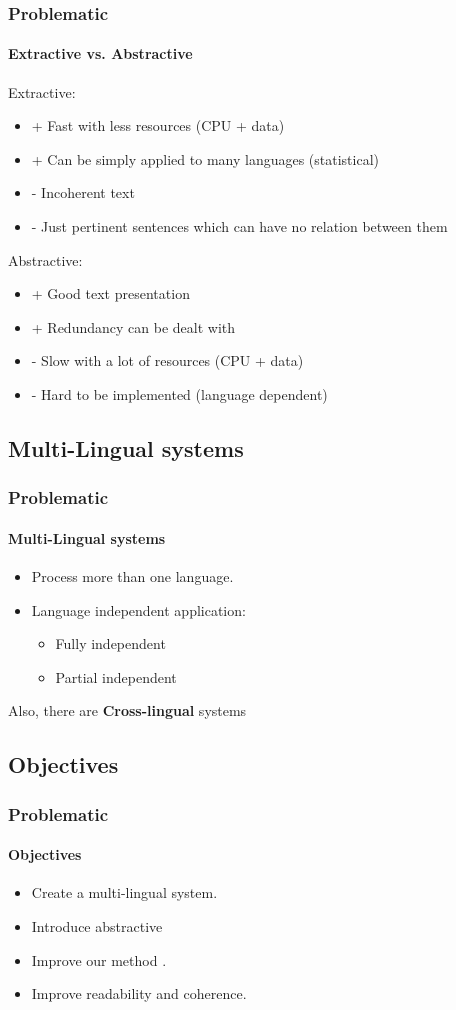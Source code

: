 \documentclass{beamer}
\begin{document}
\begin{frame}
\frametitle{Problematic}
\framesubtitle{Extractive vs. Abstractive}

Extractive:\\
\begin{itemize}
\item + Fast with less resources (CPU + data)
\item + Can be simply applied to many languages (statistical)
\item - Incoherent text
\item - Just pertinent sentences which can have no relation between them
\end{itemize}

Abstractive:\\
\begin{itemize}
\item + Good text presentation
\item + Redundancy can be dealt with
\item - Slow with a lot of resources (CPU + data)
\item - Hard to be implemented (language dependent)
\end{itemize}

\end{frame}

\subsection{Multi-Lingual systems}

\begin{frame}
\frametitle{Problematic}
\framesubtitle{Multi-Lingual systems}

\begin{itemize}
\item Process more than one language.
\item Language independent application:
\begin{itemize}
\item Fully independent 
\item Partial independent 
\end{itemize}
\end{itemize}
\vfill
Also, there are \textbf{Cross-lingual} systems

\end{frame}

\subsection{Objectives}
\begin{frame}
\frametitle{Problematic}
\framesubtitle{Objectives}

\begin{itemize}
\item Create a multi-lingual system.
\item Introduce abstractive 
\item Improve our method \cite{13-aries-al}.
\item Improve readability and coherence.
\end{itemize}
\end{frame}
\end{document}
